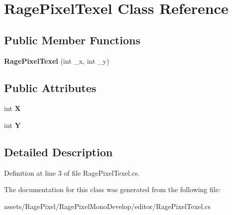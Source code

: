 \hypertarget{class_rage_pixel_texel}{\section{Rage\-Pixel\-Texel Class Reference}
\label{class_rage_pixel_texel}
}
\subsection*{Public Member Functions}
\begin{DoxyCompactItemize}
\item 
\hypertarget{class_rage_pixel_texel_a66ad67777d34e133ab5884b1ecb46037}{{\bfseries Rage\-Pixel\-Texel} (int \-\_\-x, int \-\_\-y)}\label{class_rage_pixel_texel_a66ad67777d34e133ab5884b1ecb46037}

\end{DoxyCompactItemize}
\subsection*{Public Attributes}
\begin{DoxyCompactItemize}
\item 
\hypertarget{class_rage_pixel_texel_a0cf78fe1e021f96afcd5a97b7f41cef6}{int {\bfseries X}}\label{class_rage_pixel_texel_a0cf78fe1e021f96afcd5a97b7f41cef6}

\item 
\hypertarget{class_rage_pixel_texel_aa16a598ffbdad8917bad23ecd7df0fd7}{int {\bfseries Y}}\label{class_rage_pixel_texel_aa16a598ffbdad8917bad23ecd7df0fd7}

\end{DoxyCompactItemize}


\subsection{Detailed Description}


Definition at line 3 of file Rage\-Pixel\-Texel.\-cs.



The documentation for this class was generated from the following file\-:\begin{DoxyCompactItemize}
\item 
assets/\-Rage\-Pixel/\-Rage\-Pixel\-Mono\-Develop/editor/Rage\-Pixel\-Texel.\-cs\end{DoxyCompactItemize}

